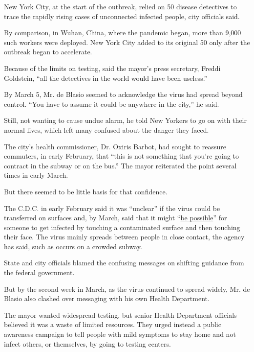 New York City, at the start of the outbreak, relied on 50 disease
detectives to trace the rapidly rising cases of unconnected infected
people, city officials said.

By comparison, in Wuhan, China, where the pandemic began, more than
9,000 such workers were deployed. New York City added to its original 50
only after the outbreak began to accelerate.

Because of the limits on testing, said the mayor's press secretary,
Freddi Goldstein, ``all the detectives in the world would have been
useless.''

By March 5, Mr. de Blasio seemed to acknowledge the virus had spread
beyond control. ``You have to assume it could be anywhere in the city,''
he said.

Still, not wanting to cause undue alarm, he told New Yorkers to go on
with their normal lives, which left many confused about the danger they
faced.

The city's health commissioner, Dr. Oxiris Barbot, had sought to
reassure commuters, in early February, that ``this is not something that
you're going to contract in the subway or on the bus.'' The mayor
reiterated the point several times in early March.

But there seemed to be little basis for that confidence.

The C.D.C. in early February said it was ``unclear'' if the virus could
be transferred on surfaces and, by March, said that it might
``\href{https://www.cdc.gov/coronavirus/2019-ncov/prevent-getting-sick/how-covid-spreads.html?CDC_AA_refVal=https\%3A\%2F\%2Fwww.cdc.gov\%2Fcoronavirus\%2F2019-ncov\%2Fprepare\%2Ftransmission.html}{be
possible}'' for someone to get infected by touching a contaminated
surface and then touching their face. The virus mainly spreads between
people in close contact, the agency has said, such as occurs on a
crowded subway.

State and city officials blamed the confusing messages on shifting
guidance from the federal government.

But by the second week in March, as the virus continued to spread
widely, Mr. de Blasio also clashed over messaging with his own Health
Department.

The mayor wanted widespread testing, but senior Health Department
officials believed it was a waste of limited resources. They urged
instead a public awareness campaign to tell people with mild symptoms to
stay home and not infect others, or themselves, by going to testing
centers.

